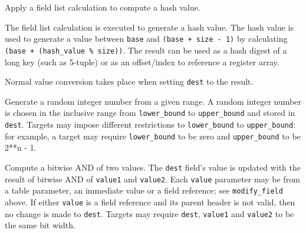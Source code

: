 \documentclass[12pt]{article}
\begin{document}

{ %
{\color{red}Apply a field list calculation to compute a hash value.}
}
{ %
}
{ %
The field list calculation is executed to generate a hash value.  
The hash value is used to generate a value between \texttt{base} and 
\texttt{(base + size - 1)} by calculating \texttt{(base + (hash_value \% size))}. 
{\color{red}
The result can be used as a hash digest of a long key (such as 5-tuple) or as 
an offset/index to reference a register array. }

Normal value conversion takes place when setting \texttt{dest} to the result.
}


{ %
{\color{red}Generate a random integer number from a given range.}
}
{ %
}
{ %
\color{red}
A random integer number is chosen in the inclusive range from \texttt{lower_bound} to \texttt{upper_bound}
and stored in \texttt{dest}. 
Targets may impose different restrictions to \texttt{lower_bound} to \texttt{upper_bound}: 
for example, a target may require \texttt{lower_bound} 
to be zero and \texttt{upper_bound} to be 2**n - 1.
}


{ %
\color{red}Compute a bitwise AND of two values.
}
{ %
}
{ %
\color{red}
The \texttt{dest} field's value is updated with the result of bitwise AND of
\texttt{value1} and \texttt{value2}. Each \texttt{value} parameter may be from a
table parameter, an immediate value or a field reference; see \texttt{modify_field} above. If either \texttt{value}
is a field reference and its parent header is not valid, then no
change is made to \texttt{dest}.
Targets may require \texttt{dest}, \texttt{value1} and \texttt{value2} to
be the same bit width.
}
\end{document}

